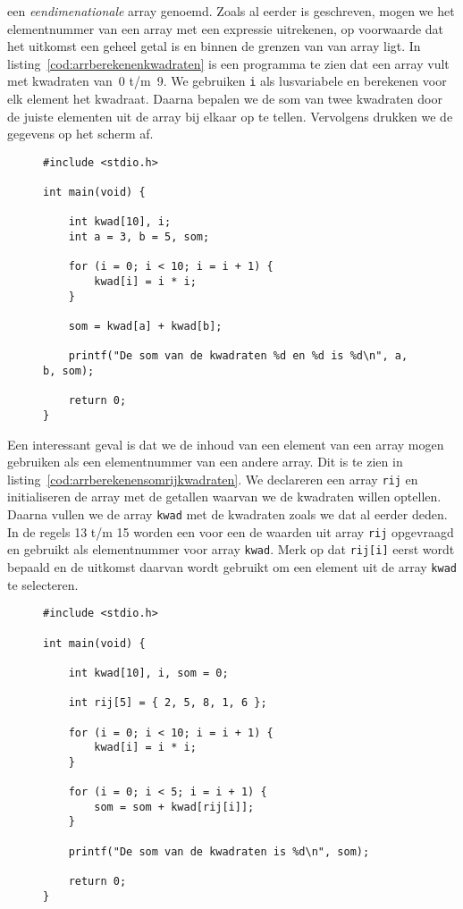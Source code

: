 een \textsl{eendimenationale} array genoemd.
Zoals al eerder is geschreven, mogen we het elementnummer van een array met een expressie uitrekenen, op voorwaarde dat het uitkomst een geheel getal is en binnen de grenzen van van array ligt. In listing~\ref{cod:arrberekenenkwadraten} is een programma te zien dat een array vult met kwadraten van~0 t/m~9. We gebruiken \texttt{i} als lusvariabele en berekenen voor elk element het kwadraat. Daarna bepalen we de som van twee kwadraten door de juiste elementen uit de array bij elkaar op te tellen. Vervolgens drukken we de gegevens op het scherm af.

\begin{figure}[!ht]
\begin{lstlisting}[caption=Afdrukken van de som van twee kwadraten kwadraten.,label=cod:arrberekenenkwadraten]
#include <stdio.h>

int main(void) {

    int kwad[10], i;
    int a = 3, b = 5, som;

    for (i = 0; i < 10; i = i + 1) {
        kwad[i] = i * i;
    }

    som = kwad[a] + kwad[b];

    printf("De som van de kwadraten %d en %d is %d\n", a, b, som);

    return 0;
}
\end{lstlisting}
\end{figure}

Een interessant geval is dat we de inhoud van een element van een array mogen gebruiken als een elementnummer van een andere array. Dit is te zien in listing~\ref{cod:arrberekenensomrijkwadraten}. We declareren een array \texttt{rij} en initialiseren de array met de getallen waarvan we de kwadraten willen optellen. Daarna vullen we de array \texttt{kwad} met de kwadraten zoals we dat al eerder deden. In de regels 13 t/m 15 worden een voor een de waarden uit array \texttt{rij} opgevraagd en gebruikt als elementnummer voor array \texttt{kwad}. Merk op dat \texttt{rij[i]} eerst wordt bepaald en de uitkomst daarvan wordt gebruikt om een element uit de array \texttt{kwad} te selecteren.

\begin{figure}[!ht]
\begin{lstlisting}[caption=Afdrukken van de som van twee kwadraten kwadraten.,label=cod:arrberekenensomrijkwadraten]
#include <stdio.h>

int main(void) {
 
    int kwad[10], i, som = 0;

    int rij[5] = { 2, 5, 8, 1, 6 };

    for (i = 0; i < 10; i = i + 1) {
        kwad[i] = i * i;
    }

    for (i = 0; i < 5; i = i + 1) {
        som = som + kwad[rij[i]];
    }

    printf("De som van de kwadraten is %d\n", som);

    return 0;
}
\end{lstlisting}
\end{figure}

